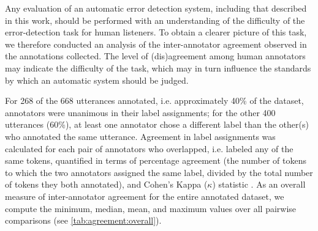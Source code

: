 \documentclass[a4paper]{article}
\begin{document}
		Any evaluation of an automatic error detection system, including that described in this work, should be performed with an understanding of the difficulty of the error-detection task for human listeners. To obtain a clearer picture of this task, we therefore conducted an analysis of the inter-annotator agreement observed in the annotations collected.
		{\color{blue} The level of (dis)agreement among human annotators may indicate the difficulty of the task, which may in turn influence the standards by which an automatic system should be judged.}
		
		
		For 268 of the 668 utterances annotated, i.e. approximately 40\% of the dataset, annotators were unanimous in their label assignments; for the other 400 utterances (60\%), at least one annotator chose a different label than the other(s) who annotated the same utterance.
		Agreement in label assignments was calculated for each pair of annotators who overlapped, i.e. labeled any of the same tokens,
		quantified
		in terms of percentage agreement (the number of tokens to which the two annotators assigned the same label, divided by the total number of tokens they both annotated), and Cohen's Kappa ($\kappa$) statistic \cite{Cohen1960}.
		As an overall measure of inter-annotator agreement for the entire annotated dataset, 
		we compute the minimum, median, mean, and maximum values over all pairwise comparisons 
		(see \cref{tab:agreement:overall}).
		
\end{document}
